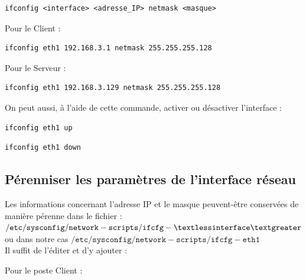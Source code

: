 \documentclass[12pt,a4paper,notitlepage]{article}
\begin{document}
\begin{lstlisting}
ifconfig <interface> <adresse_IP> netmask <masque>
\end{lstlisting}

Pour le Client :
\begin{lstlisting}
ifconfig eth1 192.168.3.1 netmask 255.255.255.128
\end{lstlisting}

Pour le Serveur :
\begin{lstlisting}
ifconfig eth1 192.168.3.129 netmask 255.255.255.128 
\end{lstlisting}
\vspace{0.3cm}


On peut aussi, à l'aide de cette commande, activer ou désactiver l'interface :

\begin{lstlisting}
ifconfig eth1 up
\end{lstlisting}

\begin{lstlisting}
ifconfig eth1 down
\end{lstlisting}
 
\subsection{Pérenniser les paramètres de l'interface réseau}

Les informations concernant l'adresse IP et le masque peuvent-être conservées de manière pérenne dans le fichier : $\mathtt{/etc/sysconfig/network-scripts/ifcfg-\textless interface\textgreater}$ 
ou dans notre cas $\mathtt{/etc/sysconfig/network-scripts/ifcfg-eth1}$\\

Il suffit de l'éditer et d'y ajouter :

\begin{center}
 \end{center}

Pour le poste Client :

\begin{center}
 \end{center}
\end{document}
